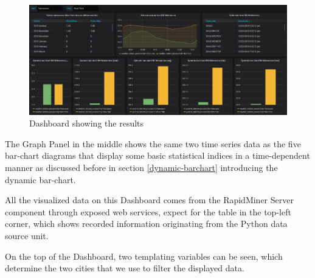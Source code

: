 \begin{figure}[h]
	\centering
	\includegraphics[width=\linewidth, keepaspectratio]{figures/final-dashboard.png}
	\caption{Dashboard showing the results}
	\label{fig:dashboard-final}
\end{figure}

The Graph Panel in the middle shows the same two time series data as the five bar-chart diagrams that display some basic statistical indices in a time-dependent manner as discussed before in section \ref{dynamic-barchart} introducing the dynamic bar-chart.

All the visualized data on this Dashboard comes from the RapidMiner Server component through exposed web services, expect for the table in the top-left corner, which shows recorded information originating from the Python data source unit.

On the top of the Dashboard, two templating variables can be seen, which determine the two cities that we use to filter the displayed data.
